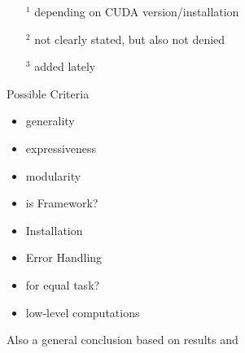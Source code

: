 \begin{itemize}
	\item[$^1$] depending on CUDA version/installation
	\item[$^2$] not clearly stated, but also not denied
	\item[$^3$] added lately
\end{itemize}

Possible Criteria%
\begin{itemize}
	\item generality
	\item expressiveness
	\item modularity
	\item is Framework?
	\item Installation 
	\item Error Handling
	\item for equal task?
	\item low-level computations
\end{itemize}
Also a general conclusion based on results and \cite{grzywaczewski2017training}